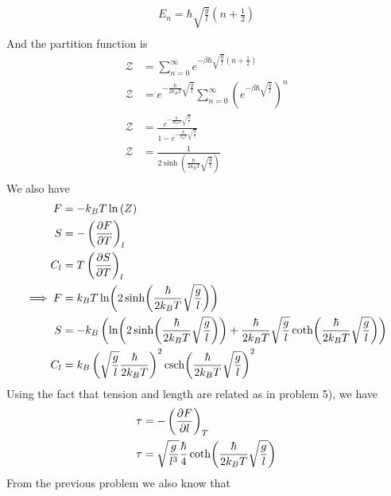 \documentclass[]{book}
\begin{document}
\begin{enumerate}[1)]
\begin{equation}
\begin{split}
E_n = \hbar \sqrt{\frac{g}{l}} (n +\frac{1}{2}) \\
\end{split}
\end{equation}
And the partition function is
\begin{equation}
\begin{split}
\mathcal{Z} & = \sum_{n=0}^{\infty} e^{- \beta\hbar \sqrt{\frac{g}{l}} (n +\frac{1}{2})}\\
\mathcal{Z} & = e^{-\frac{\hbar}{2k_BT} \sqrt{\frac{g}{l}}} \sum_{n=0}^{\infty} (e^{- \beta\hbar \sqrt{\frac{g}{l}}})^n\\
\mathcal{Z} & = \frac{e^{-\frac{\hbar}{2k_BT} \sqrt{\frac{g}{l}}}}{1 -e^{- \frac{\hbar}{k_BT} \sqrt{\frac{g}{l}}} } \\
\mathcal{Z} & = \frac{1}{2 \sinh (\frac{\hbar}{2k_BT} \sqrt{\frac{g}{l}})} \\ 
\end{split}
\end{equation}
We also have
\begin{equation}
\begin{split}
F &= -k_BT \ln \mathcal(Z) \\
S & = - \left(\pdv{F}{T}\right)_{l} \\ 
C_l & = T \left( \pdv{S}{T}   \right)_{l} \\
\implies F &= k_BT \ln(2 \sinh (\frac{\hbar}{2k_BT} \sqrt{\frac{g}{l}})) \\
S & =  - k_B\left( \ln(2 \sinh (\frac{\hbar}{2k_BT} \sqrt{\frac{g}{l}})) + \frac{\hbar}{2k_BT} \sqrt{\frac{g}{l}} \coth(\frac{\hbar}{2k_BT}\sqrt{\frac{g}{l}})\right) \\
C_l & = k_B \left(\sqrt{\frac{g}{l}} \frac{\hbar}{2k_BT}\right)^2 \csch(\frac{\hbar}{2k_BT}\sqrt{\frac{g}{l}})^2
\end{split}
\end{equation}
Using the fact that tension and length are related as in problem 5), we have
\begin{equation}
\begin{split}
\tau & = -\left( \pdv{F}{l} \right)_{T} \\
\tau & = \sqrt{\frac{g}{l^3}} \frac{\hbar}{4} \coth(\frac{\hbar}{2k_BT}\sqrt{\frac{g}{l}})  
\end{split}
\end{equation}
From the previous problem we also know that
\begin{equation}
\begin{split}

\end{split}
\end{equation}
\end{enumerate}
\end{document}
